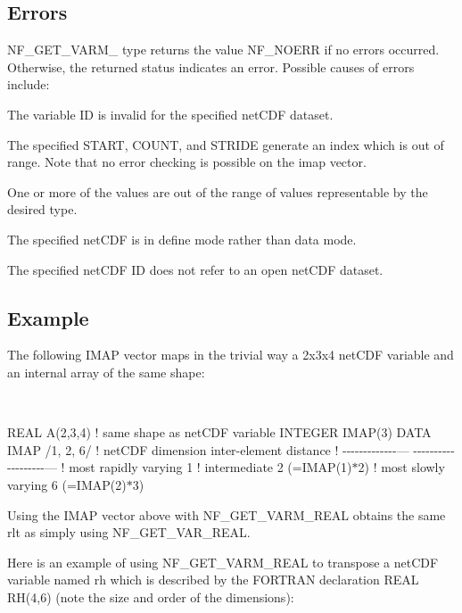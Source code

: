 \subsection*{Errors }

N\+F\+\_\+\+G\+E\+T\+\_\+\+V\+A\+R\+M\+\_\+ type returns the value N\+F\+\_\+\+N\+O\+E\+RR if no errors occurred. Otherwise, the returned status indicates an error. Possible causes of errors include\+:


\begin{DoxyItemize}
\item The variable ID is invalid for the specified net\+C\+DF dataset.
\item The specified S\+T\+A\+RT, C\+O\+U\+NT, and S\+T\+R\+I\+DE generate an index which is out of range. Note that no error checking is possible on the imap vector.
\item One or more of the values are out of the range of values representable by the desired type.
\item The specified net\+C\+DF is in define mode rather than data mode.
\item The specified net\+C\+DF ID does not refer to an open net\+C\+DF dataset.
\end{DoxyItemize}

\subsection*{Example }

The following I\+M\+AP vector maps in the trivial way a 2x3x4 net\+C\+DF variable and an internal array of the same shape\+:

 

R\+E\+AL A(2,3,4) ! same shape as net\+C\+DF variable I\+N\+T\+E\+G\+ER I\+M\+A\+P(3) D\+A\+TA I\+M\+AP /1, 2, 6/ ! net\+C\+DF dimension inter-\/element distance ! -\/-\/-\/-\/-\/-\/-\/-\/-\/-\/-\/-\/-\/--- -\/-\/-\/-\/-\/-\/-\/-\/-\/-\/-\/-\/-\/-\/-\/-\/-\/-\/-\/--- ! most rapidly varying 1 ! intermediate 2 (=I\+M\+A\+P(1)$\ast$2) ! most slowly varying 6 (=I\+M\+A\+P(2)$\ast$3)

Using the I\+M\+AP vector above with N\+F\+\_\+\+G\+E\+T\+\_\+\+V\+A\+R\+M\+\_\+\+R\+E\+AL obtains the same rlt as simply using N\+F\+\_\+\+G\+E\+T\+\_\+\+V\+A\+R\+\_\+\+R\+E\+AL.

Here is an example of using N\+F\+\_\+\+G\+E\+T\+\_\+\+V\+A\+R\+M\+\_\+\+R\+E\+AL to transpose a net\+C\+DF variable named rh which is described by the F\+O\+R\+T\+R\+AN declaration R\+E\+AL R\+H(4,6) (note the size and order of the dimensions)\+:

